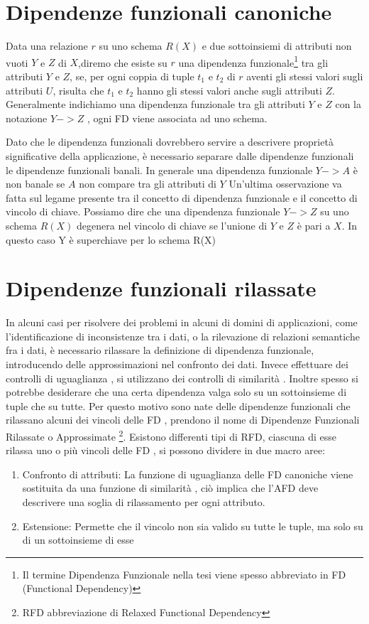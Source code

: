 \section{Dipendenze funzionali canoniche}
Data una relazione $r$ su uno schema $R(X)$ e due sottoinsiemi di attributi non vuoti $Y$ e $Z$ di $X$,diremo che esiste su $r$ una dipendenza funzionale\footnote{Il termine Dipendenza Funzionale nella tesi viene spesso abbreviato in FD (Functional Dependency)} tra gli attributi $Y$ e $Z$, se, per ogni coppia di tuple $t_1$ e $t_2$ di $r$ aventi gli stessi valori sugli attributi $U$, risulta che $t_1$ e $t_2$ hanno gli stessi valori anche sugli attributi $Z$.
Generalmente indichiamo una dipendenza funzionale tra gli attributi $Y$ e $Z$ con la notazione $Y->Z$ , ogni FD  viene associata ad uno schema.

Dato che le dipendenza funzionali dovrebbero servire a descrivere proprietà significative della applicazione, è necessario separare dalle dipendenze funzionali le dipendenze funzionali banali.
In generale una dipendenza funzionale $Y->A$ è non banale se $A$ non compare tra gli attributi di $Y$
Un'ultima osservazione va fatta sul legame presente tra il concetto di dipendenza funzionale e il concetto di vincolo di chiave. Possiamo dire che una dipendenza funzionale $Y->Z$ su uno schema $R(X)$ degenera nel vincolo di chiave se l’unione di $Y$ e $Z$ è pari a $X$. In questo caso Y è superchiave per lo schema R(X)

\section{Dipendenze funzionali rilassate}
In alcuni casi per risolvere dei problemi in alcuni di domini di applicazioni, come l’identificazione di inconsistenze tra i dati, o la rilevazione di relazioni semantiche fra i dati,  è necessario rilassare la definizione di dipendenza funzionale, introducendo delle approssimazioni nel confronto dei dati. Invece effettuare dei controlli di uguaglianza , si utilizzano dei controlli di similarità .
Inoltre spesso si potrebbe desiderare che una certa dipendenza valga solo su un sottoinsieme di tuple che su tutte.
Per questo motivo sono nate delle dipendenze funzionali che rilassano alcuni dei vincoli delle FD , prendono il nome di Dipendenze Funzionali Rilassate o Approssimate \footnote{RFD abbreviazione di Relaxed Functional Dependency}.
Esistono differenti tipi di RFD, ciascuna di esse rilassa uno o più vincoli delle FD , si possono dividere in due macro aree:
\begin{enumerate}
    \item Confronto di attributi: La funzione di uguaglianza delle FD canoniche viene sostituita da una funzione di similarità , ciò implica che l'AFD deve descrivere una soglia di rilassamento per ogni attributo.
    \item Estensione: Permette che il vincolo non sia valido su tutte le tuple, ma solo su di un sottoinsieme di esse
\end{enumerate}


